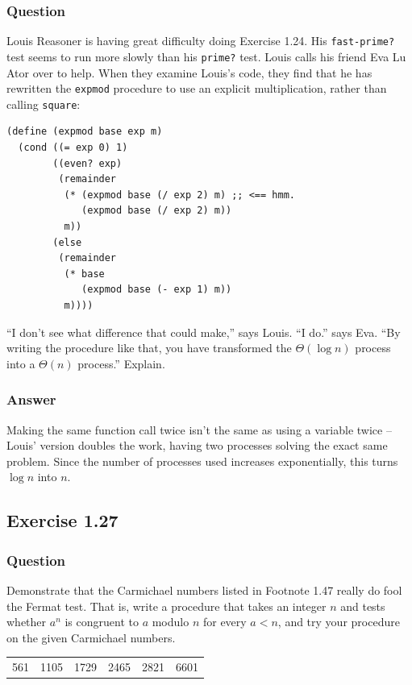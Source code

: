\documentclass[final,fleqn,titlepage,twoside]{article}
\begin{document}
\subsubsection{Question}
\label{sec:org40dcecb}
Louis Reasoner is having great difficulty doing Exercise 1.24. His
\texttt{fast-prime?} test seems to run more slowly than his
\texttt{prime?} test. Louis calls his friend Eva Lu Ator over to help. When
they examine Louis's code, they find that he has rewritten the
\texttt{expmod} procedure to use an explicit multiplication, rather than
calling \texttt{square}:

\begin{verbatim}
(define (expmod base exp m)
  (cond ((= exp 0) 1)
        ((even? exp)
         (remainder 
          (* (expmod base (/ exp 2) m) ;; <== hmm.
             (expmod base (/ exp 2) m))
          m))
        (else
         (remainder 
          (* base 
             (expmod base (- exp 1) m))
          m))))
\end{verbatim}

``I don't see what difference that could make,'' says Louis. ``I do.'' says Eva. ``By
writing the procedure like that, you have transformed the \(\Theta(\log n)\)
process into a \(\Theta(n)\) process.'' Explain.

\subsubsection{Answer}
\label{sec:org2913feb}
Making the same function call twice isn't the same as using a variable twice --
Louis' version doubles the work, having two processes solving the exact same
problem. Since the number of processes used increases exponentially, this turns
\(\log n\) into \(n\).

\subsection{Exercise 1.27}
\label{sec:org0aa429f}
\subsubsection{Question}
\label{sec:orgecf6615}
Demonstrate that the Carmichael numbers listed in Footnote 1.47 really do fool
the Fermat test. That is, write a procedure that takes an integer \(n\) and
tests whether \(a^n\) is congruent to \(a\) modulo \(n\) for every \(a < n\),
and try your procedure on the given Carmichael numbers.
\begin{table}[htbp]
\label{carmichael}
\centering
\begin{tabular}{rrrrrr}
561 & 1105 & 1729 & 2465 & 2821 & 6601\\[0pt]
\end{tabular}
\end{table}
\end{document}
